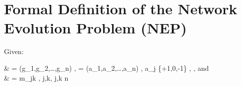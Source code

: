 

\newpage
\section{Formal Definition of the Network Evolution Problem (NEP)} \label{sup_NEP_definition}
				\noindent Given: %
				\vspace{.3cm}
				{\small
						\begin{flalign*} %
							&\mys\mys{}  = (g_1,g_2,\dots,g_n) \textrm{, }    = (a_1,a_2,\dots,a_n)  \textrm{, }  a_j \in \{+1,0,-1\} \textrm{, } \mys{}\in{}\textrm{, \mys and }  \\
							&\mys\mys{}  = \big [m_{jk}\big ] \quad {} \quad  m_{jk} \in  {}, \mys \quad\forall j,k, \leq j,k \leq n %
						\end{flalign*}
				}

